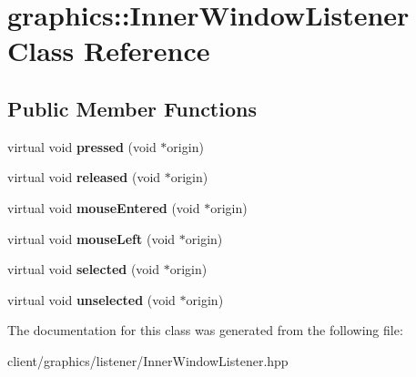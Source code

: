 \hypertarget{classgraphics_1_1_inner_window_listener}{\section{graphics\-:\-:Inner\-Window\-Listener Class Reference}
\label{classgraphics_1_1_inner_window_listener}
}
\subsection*{Public Member Functions}
\begin{DoxyCompactItemize}
\item 
\hypertarget{classgraphics_1_1_inner_window_listener_af0193ae49cc663ba02b41d93f0dbc315}{virtual void {\bfseries pressed} (void $\ast$origin)}\label{classgraphics_1_1_inner_window_listener_af0193ae49cc663ba02b41d93f0dbc315}

\item 
\hypertarget{classgraphics_1_1_inner_window_listener_a5d75e50cb7a49d908c922162a5a478f8}{virtual void {\bfseries released} (void $\ast$origin)}\label{classgraphics_1_1_inner_window_listener_a5d75e50cb7a49d908c922162a5a478f8}

\item 
\hypertarget{classgraphics_1_1_inner_window_listener_a6115481cb86d07c6d3e04d2681256f10}{virtual void {\bfseries mouse\-Entered} (void $\ast$origin)}\label{classgraphics_1_1_inner_window_listener_a6115481cb86d07c6d3e04d2681256f10}

\item 
\hypertarget{classgraphics_1_1_inner_window_listener_acaaf6bdc71d737e143ecb98440b77a6a}{virtual void {\bfseries mouse\-Left} (void $\ast$origin)}\label{classgraphics_1_1_inner_window_listener_acaaf6bdc71d737e143ecb98440b77a6a}

\item 
\hypertarget{classgraphics_1_1_inner_window_listener_a99752be77d4b5a48dc841ff7433bf9fd}{virtual void {\bfseries selected} (void $\ast$origin)}\label{classgraphics_1_1_inner_window_listener_a99752be77d4b5a48dc841ff7433bf9fd}

\item 
\hypertarget{classgraphics_1_1_inner_window_listener_a8da27c0b432f27dfbe68fe3be95d5378}{virtual void {\bfseries unselected} (void $\ast$origin)}\label{classgraphics_1_1_inner_window_listener_a8da27c0b432f27dfbe68fe3be95d5378}

\end{DoxyCompactItemize}


The documentation for this class was generated from the following file\-:\begin{DoxyCompactItemize}
\item 
client/graphics/listener/Inner\-Window\-Listener.\-hpp\end{DoxyCompactItemize}
